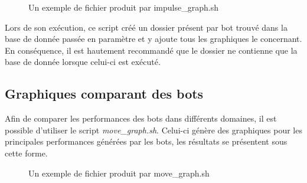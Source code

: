 \documentclass[10pt,a4paper]{report}
\begin{document}
\begin{figure}[H]
	\caption{\label{fig:impulse_graph} Un exemple de fichier produit par impulse\_graph.sh}
\end{figure}

Lors de son exécution, ce script créé un dossier présent par bot trouvé dans
la base de donnée passée en paramètre et y ajoute tous les graphiques le
concernant. En conséquence, il est hautement recommandé que le dossier ne
contienne que la base de donnée lorsque celui-ci est exécuté.

\subsection{Graphiques comparant des bots}
Afin de comparer les performances des bots dans différents domaines, il est
possible d'utiliser le script \emph{move\_graph.sh}. Celui-ci génère des
graphiques pour les principales performances générées par les bots, les
résultats se présentent sous cette forme.

\begin{figure}[H]
  \caption{\label{fig:move_graph} Un exemple de fichier produit par move\_graph.sh}
\end{figure}
\end{document}
